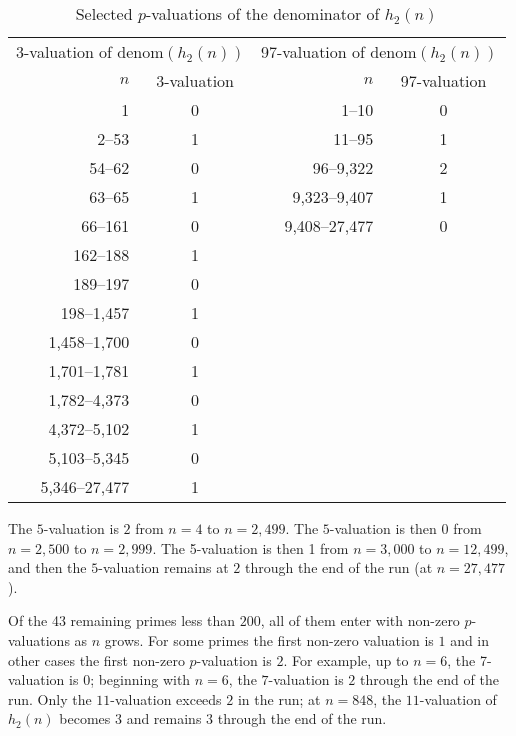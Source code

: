 \documentclass{article}
\begin{document}
\begin{table}[]
\caption{Selected $p$-valuations of the denominator of $h_2\left(n\right)$}
\label{tab:p-vals-of-H2}\centering
\begin{tabular}{rc|rc}
  \multicolumn{2}{c|}{3-valuation of $\mbox{denom}(h_2\left(n\right))$} & \multicolumn{2}{c}{97-valuation of $\mbox{denom}(h_2\left(n\right))$} \\ 
$n$           & 3-valuation & $n$           & 97-valuation \\
1             & 0           & 1--10         & 0            \\
2--53         & 1           & 11--95        & 1            \\
54--62        & 0           & 96--9,322     & 2            \\
63--65        & 1           & 9,323--9,407  & 1            \\
66--161       & 0           & 9,408--27,477 & 0            \\
162--188      & 1           &                              \\ 
189--197      & 0           &                              \\ 
198--1,457    & 1           &                              \\ 
1,458--1,700  & 0           &                              \\ 
1,701--1,781  & 1           &                              \\ 
1,782--4,373  & 0           &                              \\ 
4,372--5,102  & 1           &                              \\ 
5,103--5,345  & 0           &                              \\ 
5,346--27,477 & 1           & 
\end{tabular}%
\end{table}

The $5$-valuation is $2$ from $n=4$ to $n=2,499$. The $5$-valuation is then $%
0 $ from $n=2,500$ to $n=2,999$. The 5-valuation is then 1 from $n=3,000$ to $%
n=12,499$, and then the $5$-valuation remains at $2$ through the end of the
run (at $n=27,477$).

Of the 43 remaining primes less than $200$, all of them enter with non-zero $%
p$-valuations as $n$ grows. For some primes the first non-zero valuation is $%
1$ and in other cases the first non-zero $p$-valuation is $2$. For example,
up to $n=6$, the 7-valuation is $0$; beginning with $n=6$, the $7$-valuation
is $2$ through the end of the run. Only the $11$-valuation exceeds $2$ in
the run; at $n=848$, the $11$-valuation of $h_{2}\left( n\right) $ becomes $%
3 $ and remains $3$ through the end of the run.
\end{document}
